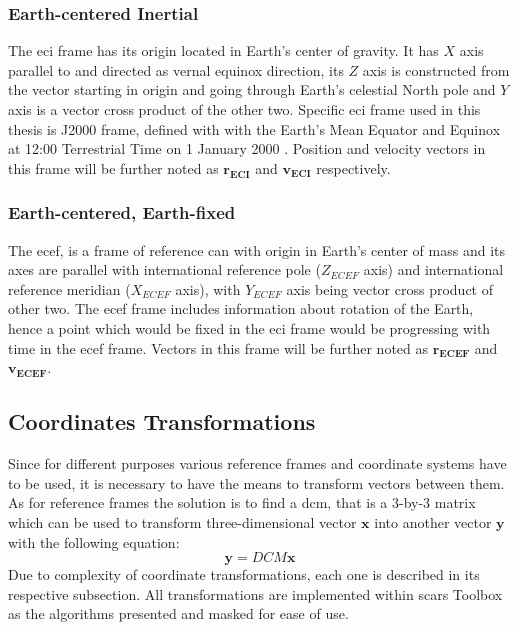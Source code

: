     \subsubsection{Earth-centered Inertial}
        The \ac{eci} frame has its origin located in Earth's center of gravity. It has $X$ axis parallel to and directed as vernal equinox direction, its $Z$ axis is constructed from the vector starting in origin and going through Earth's celestial North pole and $Y$ axis is a vector cross product of the other two. Specific \ac{eci} frame used in this thesis is J2000 frame, defined with with the Earth's Mean Equator and Equinox at 12:00 Terrestrial Time on 1 January 2000 \cite{schutz2004statistical}. Position and velocity vectors in this frame will be further noted as $\textbf{r}_\textbf{ECI}$ and $\textbf{v}_\textbf{ECI}$ respectively.

    \subsubsection{Earth-centered, Earth-fixed}
        The \ac{ecef}, is a frame of reference can with origin in Earth's center of mass and its axes are parallel with international reference pole ($Z_{ECEF}$ axis) and international reference meridian ($X_{ECEF}$ axis), with $Y_{ECEF}$ axis being vector cross product of other two. The \ac{ecef} frame includes information about rotation of the Earth, hence a point which would be fixed in the \ac{eci} frame would be progressing with time in the \ac{ecef} frame. Vectors in this frame will be further noted as $\textbf{r}_{\textbf{ECEF}}$ and $\textbf{v}_{\textbf{ECEF}}$.

\clearpage
\subsection{Coordinates Transformations}
    Since for different purposes various reference frames and coordinate systems have to be used, it is necessary to have the means to transform vectors between them. As for reference frames the solution is to find a \ac{dcm}, that is a 3-by-3 matrix which can be used to transform three-dimensional vector $\textbf{x}$ into another vector $\textbf{y}$ with the following equation:
    \begin{equation}
        \textbf{y} = DCM\textbf{x}
    \end{equation}
    Due to complexity of coordinate transformations, each one is described in its respective subsection. All transformations are implemented within \ac{scars} Toolbox as the algorithms presented and masked for ease of use.
    
